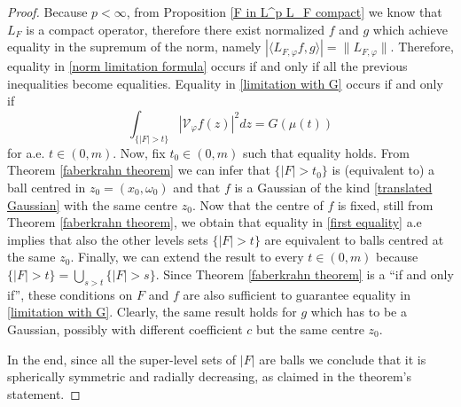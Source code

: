 \documentclass[corpo=11pt, stile=classica, tipotesi=custom,
greek, evenboxes, english]{toptesi}
\numberwithin{equation}{chapter}
\theoremstyle{definition}
\theoremstyle{remark}
\newcommand{\V}{\mathcal{V}} %
\begin{document}
\begin{proof}
	Because $p<\infty$, from Proposition \ref{F in L^p L_F compact} we know that $L_F$ is a compact operator, therefore there exist normalized $f$ and $g$ which achieve equality in the supremum of the norm, namely $|\langle L_{F, \varphi} f, g \rangle| = \| L_{F, \varphi} \|$. Therefore, equality in \eqref{norm limitation formula} occurs if and only if all the previous inequalities become equalities. Equality in \eqref{limitation with G} occurs if and only if
	\begin{equation}\label{first equality}
		\int_{\{|F|>t\}} |\V_{\varphi} f(z)|^2 dz = G(\mu(t))
	\end{equation}
	for a.e. $t \in (0,m)$. Now, fix $t_0 \in (0,m)$ such that equality holds. From Theorem \ref{faberkrahn theorem} we can infer that $\{|F|>t_0\}$ is (equivalent to) a ball centred in $z_0 = (x_0,\omega_0)$ and that $f$ is a Gaussian of the kind \eqref{translated Gaussian} with the same centre $z_0$. Now that the centre of $f$ is fixed, still from Theorem \ref{faberkrahn theorem}, we obtain that equality in \eqref{first equality} a.e implies that also the other levels sets $\{|F|>t\}$ are equivalent to balls centred at the same $z_0$. Finally, we can extend the result to every $t \in (0,m)$ because $\{|F|>t\} = \bigcup_{s > t} \{|F|>s\}$. Since Theorem \ref{faberkrahn theorem} is a ``if and only if'', these conditions on $F$ and $f$ are also sufficient to guarantee equality in \eqref{limitation with G}. Clearly, the same result holds for $g$ which has to be a Gaussian, possibly with different coefficient $c$ but the same centre $z_0$.
	
	In the end, since all the super-level sets of $|F|$ are balls we conclude that it is spherically symmetric and radially decreasing, as claimed in the theorem's statement.
	

\end{proof}
\end{document}
